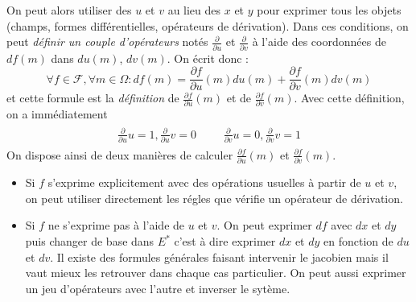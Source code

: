 On peut alors utiliser des $u$ et $v$ au lieu des $x$ et $y$ pour exprimer tous les objets (champs, formes différentielles, opérateurs de dérivation).\newline
Dans ces conditions, on peut \emph{définir un couple d'opérateurs} notés $\frac{\partial}{\partial u}$ et $\frac{\partial}{\partial v}$ à l'aide des coordonnées de $df(m)$ dans $du(m)$, $dv(m)$. On écrit donc :
\begin{displaymath}
 \forall f \in \mathcal F, \forall m\in \Omega :
df(m) = \frac{\partial f}{\partial u}(m)du(m) + \frac{\partial f}{\partial v}(m)dv(m)
\end{displaymath}
et cette formule est la \emph{définition} de $\frac{\partial f}{\partial u}(m)$ et de $\frac{\partial f}{\partial v}(m)$.\newline
Avec cette définition, on a immédiatement
\begin{align*}
 \begin{gathered}
  \frac{\partial}{\partial u}u=1 , \frac{\partial}{\partial u}v = 0
 \end{gathered}
& &
 \begin{gathered}
  \frac{\partial}{\partial v}u=0 , \frac{\partial}{\partial v}v = 1
 \end{gathered}
\end{align*}
On dispose ainsi de deux manières de calculer $\frac{\partial f}{\partial u}(m)$ et $\frac{\partial f}{\partial v}(m)$. 
\begin{itemize}
 \item Si $f$ s'exprime explicitement avec des opérations usuelles à partir de $u$ et $v$, on peut utiliser directement les régles que vérifie un opérateur de dérivation.
\item Si $f$ ne s'exprime pas à l'aide de $u$ et $v$. On peut exprimer $df$ avec $dx$ et $dy$ puis changer de base dans $E^*$ c'est à dire exprimer $dx$ et $dy$ en fonction de $du$ et $dv$. Il existe des formules générales faisant intervenir le jacobien mais il vaut mieux les retrouver dans chaque cas particulier. On peut aussi exprimer un jeu d'opérateurs avec l'autre et inverser le sytème.
\end{itemize}
